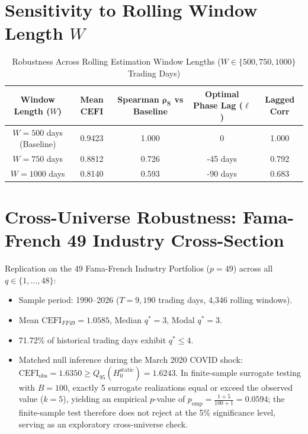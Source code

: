 \documentclass[12pt]{article}
\begin{document}
\section{Sensitivity to Rolling Window Length \texorpdfstring{$W$}{W}}
\label{app:window_length}

\begin{table}[htbp]
\centering
\caption{Robustness Across Rolling Estimation Window Lengths ($W \in \{500, 750, 1000\}$ Trading Days)}
\label{tab:app_window}
\begin{tabular}{ccccc}
\toprule
\textbf{Window Length ($W$)} & \textbf{Mean } $\mathbf{CEFI}$ & \textbf{Spearman } $\mathbf{\rho_S}$ vs Baseline & \textbf{Optimal Phase Lag ($\ell$)} & \textbf{Lagged Corr} \\
\midrule
$W = 500$ days (Baseline) & 0.9423 & 1.000 & 0 & 1.000 \\
$W = 750$ days            & 0.8812 & 0.726 & -45 days & 0.792 \\
$W = 1000$ days           & 0.8140 & 0.593 & -90 days & 0.683 \\
\bottomrule
\end{tabular}
\end{table}

\section{Cross-Universe Robustness: Fama-French 49 Industry Cross-Section}
\label{app:ff49}

Replication on the 49 Fama-French Industry Portfolios ($p=49$) across all $q \in \{1, \dots, 48\}$:
\begin{itemize}
    \item Sample period: 1990--2026 ($T = 9,190$ trading days, 4,346 rolling windows).
    \item Mean $\mathrm{CEFI}_{FF49} = 1.0585$, Median $q^* = 3$, Modal $q^* = 3$.
    \item 71.72\% of historical trading days exhibit $q^* \le 4$.
    \item Matched null inference during the March 2020 COVID shock: $\mathrm{CEFI}_{\text{obs}} = 1.6350 \ge Q_{95}(H_0^{\text{static}}) = 1.6243$. In finite-sample surrogate testing with $B=100$, exactly 5 surrogate realizations equal or exceed the observed value ($k=5$), yielding an empirical $p$-value of $p_{\text{emp}} = \frac{1 + 5}{100 + 1} = 0.0594$; the finite-sample test therefore does not reject at the 5\% significance level, serving as an exploratory cross-universe check.
\end{itemize}
\end{document}
